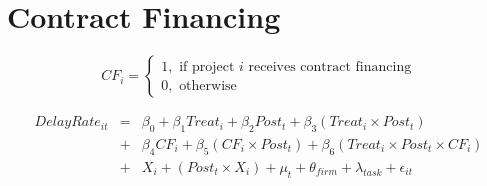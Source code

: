 \documentclass[
]{article}
\begin{document}
\hypertarget{contract-financing}{%
\section{Contract Financing}\label{contract-financing}}

\[ CF_i = \begin{cases} 1, \text{ if project } i \text{ receives contract financing}\\
0, \text{ otherwise} \end{cases}\]

\[ \begin{aligned}
DelayRate_{it} &=& \beta_0+\beta_1 Treat_i + \beta_2 Post_t + \beta_3 (Treat_i \times Post_t) \\
&+&\beta_4 CF_i + \beta_5 (CF_i \times Post_t) + \beta_6 (Treat_i \times Post_t \times CF_i) \\ 
&+&X_i + (Post_t \times X_i) + \mu_t + \theta_{firm} + \lambda_{task}+ \epsilon_{it}
\end{aligned}\]
\end{document}
